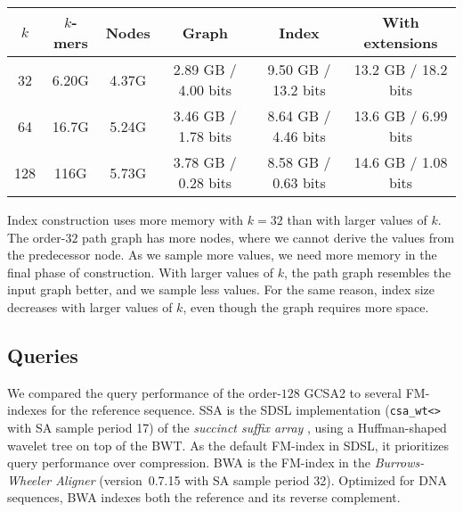 \documentclass[twoside,leqno,twocolumn]{article}
\newcommand{\kmer}[1]{$#1$\nobreakdash-mer}
\newcommand{\orderk}[1]{order\nobreakdash-$#1$}
\newcommand{\bvOUT}{\ensuremath{\mathsf{OUT}}}
\begin{document}
\begin{table*}[t]
\begin{center}
\begin{tabular}{c|cc|c|c|c}
\hline
$k$ & \textbf{\kmer{k}s} & \textbf{Nodes} & \textbf{Graph} & \textbf{Index} & \textbf{With extensions} \\
\hline
 32 & 6.20G & 4.37G & 2.89 GB / 4.00 bits & 9.50 GB / 13.2 bits & 13.2 GB / 18.2 bits \\
 64 & 16.7G & 5.24G & 3.46 GB / 1.78 bits & 8.64 GB / 4.46 bits & 13.6 GB / 6.99 bits \\
128 &  116G & 5.73G & 3.78 GB / 0.28 bits & 8.58 GB / 0.63 bits & 14.6 GB / 1.08 bits \\
\hline
\end{tabular}
\caption{GCSA2 index sizes. Order of the path graph; number of \kmer{k}s and nodes in the path graph in billions; index size in gigabytes and in bits per \kmer{k} for the graph ($B_{c}$ and $\bvOUT$), the index (the graph, $B_{S}$, $B_{V}$, and $V_{S}$), and the index with the extensions from Appendix~\ref{appendix:extensions}.}\label{table:indexes}
\end{center}
\end{table*}

Index construction uses more memory with $k = 32$ than with larger values of $k$. The \orderk{32} path graph has more nodes, where we cannot derive the values from the predecessor node. As we sample more values, we need more memory in the final phase of construction. With larger values of $k$, the path graph resembles the input graph better, and we sample less values. For the same reason, index size decreases with larger values of $k$, even though the graph requires more space.

\subsection{Queries}

We compared the query performance of the \orderk{128} GCSA2 to several FM-indexes for the reference sequence. SSA is the SDSL implementation (\texttt{csa\_wt<>} with SA sample period 17) of the \emph{succinct suffix array} \cite{Maekinen2005}, using a Huffman-shaped wavelet tree on top of the BWT. As the default FM-index in SDSL, it prioritizes query performance over compression. BWA is the FM-index in the \emph{Burrows-Wheeler Aligner} \cite{Li2009} (version~0.7.15 with SA sample period 32). Optimized for DNA sequences, BWA indexes both the reference and its reverse complement.
\end{document}
